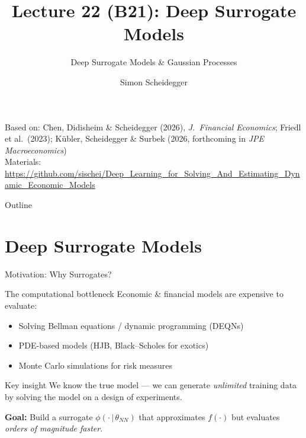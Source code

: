 \documentclass[aspectratio=169,11pt]{beamer}
\title[Lecture 22 (B21)]{Lecture 22 (B21): Deep Surrogate Models}
\subtitle{Deep Surrogate Models \& Gaussian Processes}
\author{Simon Scheidegger}
\institute{HEC, University of Lausanne}
\date{}
\newcommand{\emphc}[1]{\textcolor{harvardcrimson}{#1}}
\begin{document}
\newcommand{\exercisepause}{%
  \tikz[baseline=(X.base)]{\node[fill=darkgreen!80!black, text=white,
  rounded corners=2pt, inner sep=3pt, font=\scriptsize\bfseries](X){PAUSE --- 5 min};}}


{
\begin{frame}
\titlepage
\vspace{-0.4cm}
\begin{center}
{\footnotesize Based on: Chen, Didisheim \& Scheidegger (2026), \emph{J.\ Financial Economics}; Friedl et al.\ (2023); K\"ubler, Scheidegger \& Surbek (2026, forthcoming in \emph{JPE Macroeconomics})}\\[4pt]
{\footnotesize Materials: \url{https://github.com/sischei/Deep_Learning_for_Solving_And_Estimating_Dynamic_Economic_Models}}
\end{center}
\end{frame}
}

\begin{frame}{Outline}
\tableofcontents
\end{frame}

\section{Deep Surrogate Models}

\begin{frame}{Motivation: Why Surrogates?}
\begin{block}{The computational bottleneck}
Economic \& financial models are expensive to evaluate:
\begin{itemize}
  \item Solving Bellman equations / dynamic programming (DEQNs)
  \item PDE-based models (HJB, Black--Scholes for exotics)
  \item Monte Carlo simulations for risk measures
\end{itemize}
\end{block}

\vspace{0.3cm}
\begin{alertblock}{Key insight}
\emphc{We know the true model} --- we can generate \emph{unlimited} training data by solving the model on a design of experiments.
\end{alertblock}

\vspace{0.3cm}
\textbf{Goal:} Build a \emphc{surrogate} $\phi(\cdot\,|\,\theta_{NN})$ that approximates $f(\cdot)$ but evaluates \emph{orders of magnitude faster}.
\end{frame}
\end{document}
